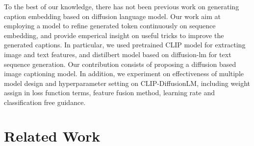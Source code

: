\documentclass{article}
\begin{document}
To the best of our knowledge, there has not been previous work on generating caption embedding based on diffusion language model. Our work aim at employing a model to refine generated token continuously on sequence embedding, and provide emperical insight on useful tricks to improve the generated captions. In particular, we used pretrained CLIP model for extracting image and text features, and distilbert model based on diffusion-lm for text sequence generation. Our contribution consists of proposing a diffusion based image captioning model{}. In addition, we experiment on effectiveness of multiple model design and hyperparameter setting on CLIP-DiffusionLM, including weight assign in loss function terms{}, feature fusion method{}, learning rate{} and classification free guidance{}.

\section{Related Work}
\label{sec:headings}
\end{document}
